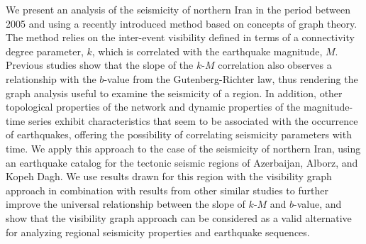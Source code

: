 %
We present an analysis of the seismicity of northern Iran in the period between 2005 and  using a recently introduced method based on concepts of graph theory. The method relies on the inter-event visibility defined in terms of a connectivity degree parameter, $k$, which is correlated with the earthquake magnitude, $M$. Previous studies show that the slope of the $k$-$M$ correlation also observes a relationship with the $b$-value from the Gutenberg-Richter law, thus rendering the graph analysis useful to examine the seismicity of a region. In addition, other topological properties of the network and dynamic properties of the magnitude-time series exhibit characteristics that seem to be associated with the occurrence of earthquakes, offering the possibility of correlating seismicity parameters with time. We apply this approach to the case of the seismicity of northern Iran, using an earthquake catalog for the tectonic seismic regions of Azerbaijan, Alborz, and Kopeh Dagh. We use results drawn for this region with the visibility graph approach in combination with results from other similar studies to further improve the universal relationship between the slope of $k$-$M$ and $b$-value, and show that the visibility graph approach can be considered as a valid alternative for analyzing regional seismicity properties and earthquake sequences.

